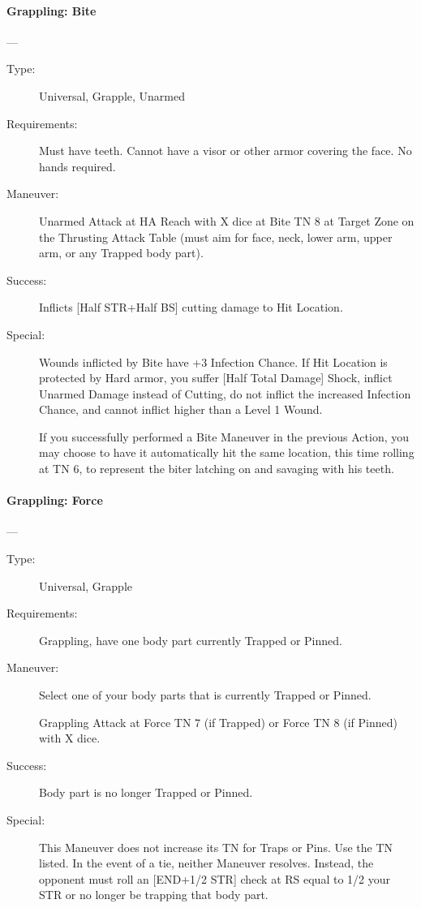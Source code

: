 \paragraph{Grappling: Bite \large} \label{man:grappling-bite}
 ---\quad {\large [X+1]}
\vspace{-10pt} \begin{description}
\item [Type:] Universal, Grapple, Unarmed
\item [Requirements:] Must have teeth. Cannot have a visor or other armor
  covering the face. No hands required. 
\item [Maneuver:] Unarmed Attack at HA Reach with X dice at Bite TN 8 at Target
  Zone on the Thrusting Attack Table (must aim for face, neck, lower arm, upper
  arm, or any Trapped body part). 
\item [Success:] Inflicts [Half STR+Half BS] cutting damage to Hit Location.
\item [Special:] Wounds inflicted by Bite have +3 Infection Chance.
If Hit Location is protected by Hard armor, you suffer [Half Total Damage]
Shock, inflict Unarmed Damage instead of Cutting, do not inflict the increased
Infection Chance, and cannot inflict higher than a Level 1 Wound. 

If you successfully performed a Bite Maneuver in the previous Action, you may
choose to have it automatically hit the same location, this time rolling at TN
6, to represent the biter latching on and savaging with his teeth. 
\end{description}

\paragraph{Grappling: Force \large} \label{man:grappling-force}
---\quad {\large [X+2]}
\vspace{-10pt} \begin{description}
\item [Type:] Universal, Grapple
\item [Requirements:] Grappling, have one body part currently Trapped or Pinned.
\item [Maneuver:] Select one of your body parts that is currently Trapped or
  Pinned.

  Grappling Attack at Force TN 7 (if Trapped) or Force TN 8 (if Pinned)
  with X dice.  
\item [Success:] Body part is no longer Trapped or Pinned.
\item [Special:] This Maneuver does not increase its TN for Traps or Pins. Use
  the TN listed. In the event of a tie, neither Maneuver resolves. Instead, the
  opponent must roll an [END+1/2 STR] check at RS equal to 1/2 your STR or no
  longer be trapping that body part.  
\end{description}

